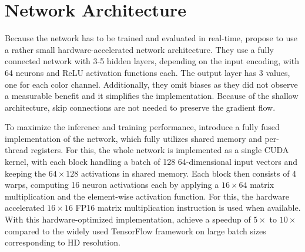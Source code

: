 \section{Network Architecture}
\label{sec:fully_fused}
Because the network has to be trained and evaluated in real-time, \textcite{muller2021,muller2022} propose to use a rather small hardware-accelerated network architecture.
They use a fully connected network with 3-5 hidden layers, depending on the input encoding, with 64 neurons and ReLU activation functions each.
The output layer has 3 values, one for each color channel.
Additionally, they omit biases as they did not observe a measurable benefit and it simplifies the implementation.
Because of the shallow architecture, skip connections are not needed to preserve the gradient flow.

To maximize the inference and training performance, \textcite{muller2021} introduce a fully fused implementation of the network, which fully utilizes shared memory and per-thread registers.
For this, the whole network is implemented as a single CUDA kernel, with each block handling a batch of 128 64-dimensional input vectors and keeping the $64\times128$ activations in shared memory.
Each block then consists of 4 warps, computing 16 neuron activations each by applying a $16\times64$ matrix multiplication and the element-wise activation function.
For this, the hardware accelerated $16\times16$ FP16 matrix multiplication instruction is used when available.
With this hardware-optimized implementation, \textcite{muller2021} achieve a speedup of $5\times$ to $10\times$ compared to the widely used TensorFlow framework \parencite{tensorflowdevelopers2021} on large batch sizes corresponding to HD resolution.

